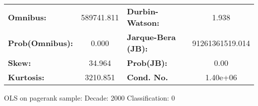 \begin{center}
\begin{tabular}{lccccc}
\bottomrule
\end{tabular}
\begin{tabular}{lclc}
\textbf{Omnibus:}       & 589741.811 & \textbf{  Durbin-Watson:     } &        1.938     \\
\textbf{Prob(Omnibus):} &    0.000   & \textbf{  Jarque-Bera (JB):  } & 91261361519.014  \\
\textbf{Skew:}          &   34.964   & \textbf{  Prob(JB):          } &         0.00     \\
\textbf{Kurtosis:}      &  3210.851  & \textbf{  Cond. No.          } &     1.40e+06     \\
\bottomrule
\end{tabular}
\end{center}
\break
OLS on pagerank sample: Decade: 2000 Classification: 0
